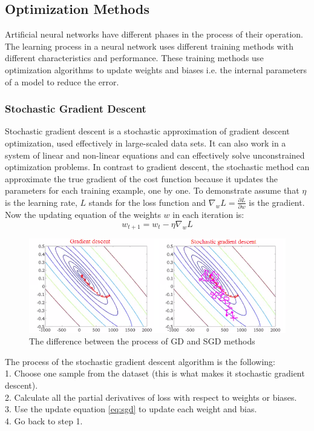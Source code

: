 \subsection{Optimization Methods}

Artificial neural networks have different phases in the process of their operation. The learning process in a neural network uses different training methods with different characteristics and performance. These training methods use optimization algorithms to update weights and biases i.e. the internal parameters of a model to reduce the error. \cite{veerarajan2007numerical}\cite{pillo2013nonlinear}\cite{sathasivam2003optimization}



\subsubsection{Stochastic Gradient Descent}

Stochastic gradient descent is a stochastic approximation of gradient descent optimization, used effectively in large-scaled data sets. It can also work in a system of linear and non-linear equations and can effectively solve unconstrained optimization problems. In contrast to gradient descent, the stochastic method can approximate the true gradient of the cost function because it updates the parameters for each training example, one by one. To demonstrate assume that $\eta$ is the learning rate, $L$ stands for the loss function and $\nabla_w L = \frac{\partial L}{\partial w}$ is the gradient. Now the updating equation of the weights $w$ in each iteration is:
\begin{equation} w_{t+1} = w_t - \eta \nabla_w L \label{eq:sgd} \end{equation} 

\begin{figure}[h]
	\centering
	\includegraphics[height=0.28\linewidth]{./figures/stochastic}
	\caption{The difference between the process of GD and SGD methods}
	\label{fig:stochastic}
\end{figure}

\noindent The process of the stochastic gradient descent algorithm is the following:\\
1. Choose one sample from the dataset (this is what makes it stochastic gradient descent).\\
2. Calculate all the partial derivatives of loss with respect to weights or biases. \\
3. Use the update equation \eqref{eq:sgd} to update each weight and bias.\\
4. Go back to step 1.


